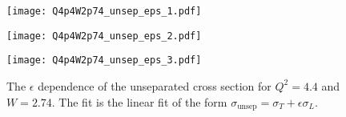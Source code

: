 \begin{figure}
  \centering
  \begin{minipage}[b]{0.48\linewidth}
    \texttt{[image: Q4p4W2p74\_unsep\_eps\_1.pdf]}
  \end{minipage}
  \hfill
  \begin{minipage}[b]{0.48\linewidth}
    \texttt{[image: Q4p4W2p74\_unsep\_eps\_2.pdf]}
  \end{minipage}
  \begin{minipage}[b]{0.48\linewidth}
    \texttt{[image: Q4p4W2p74\_unsep\_eps\_3.pdf]}
  \end{minipage}
  \caption{The $\epsilon$ dependence of the unseparated cross section for $Q^2=4.4$ and $W=2.74$. The fit is the linear fit of the form $\sigma_{\mathrm{unsep}}=\sigma_T+\epsilon\sigma_L$.}
  \label{fig:Q4p4W2p74_unsep_eps}
\end{figure}


